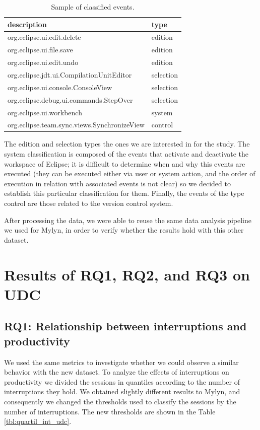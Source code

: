 \documentclass[times]{smrauth}
\begin{document}
\begin{table}[ht!]
\renewcommand{\arraystretch}{1.3}
\caption{Sample of classified events. }
\label{tbl:ej_events_udc}
\centering
\begin{tabular}{|p{7.5cm}| p{2 cm} |} 
  \hline 
description & type \\  
  \hline 
    \hline 
org.eclipse.ui.edit.delete & edition \\
org.eclipse.ui.file.save & edition \\
org.eclipse.ui.edit.undo & edition \\
org.eclipse.jdt.ui.CompilationUnitEditor & selection \\
org.eclipse.ui.console.ConsoleView & selection \\
org.eclipse.debug.ui.commands.StepOver & selection \\ 
org.eclipse.ui.workbench & system \\
org.eclipse.team.sync.views.SynchronizeView & control \\
\hline
\end{tabular}
\end{table}

The edition and selection types the ones we are interested in for the study. The system classification is composed of the events that activate and deactivate the workspace of Eclipse; it is difficult to determine when and why this events are executed (they can be executed either via user or system action, and the order of execution in relation with associated events is not clear) so we decided to establish this particular classification for them. Finally, the events of the type control are those related to the version control system. 

After processing the data, we were able to reuse the same data analysis pipeline we used for Mylyn, in order to verify whether the results hold with this other dataset.

\section{Results of RQ1, RQ2, and RQ3 on UDC}

\subsection{RQ1: Relationship between interruptions and productivity}
We used the same metrics to investigate whether we could observe a similar behavior with the new dataset. To analyze the effects of interruptions on productivity we divided the sessions in quantiles according to the number of interruptions they hold. We obtained slightly different results to Mylyn, and consequently we changed the thresholds used to classify the sessions by the number of interruptions. The new thresholds are shown in the Table \ref{tbl:quartil_int_udc}.
\end{document}
